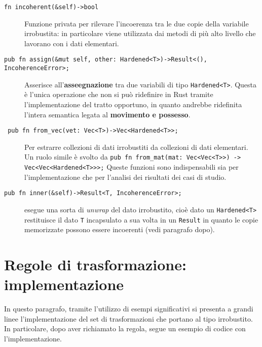 \begin{description}
    \item[\texttt{fn incoherent(\&self)->bool}] Funzione privata per rilevare l'incoerenza tra le due copie della variabile irrobustita: in particolare viene utilizzata dai metodi di più alto livello che lavorano con i dati elementari.
    \item[\texttt{pub fn assign(\&mut self, other: Hardened<T>)->Result<(), IncoherenceError>;}] Asserisce all'\textbf{asseegnazione} tra due variabili di tipo \texttt{Hardened<T>}. Questa è l'unica operazione che non si può ridefinire in Rust tramite l'implementazione del tratto opportuno, in quanto andrebbe ridefinita l'intera semantica legata al \textbf{movimento e possesso}.
    \item[\texttt{ pub fn from\_vec(vet: Vec<T>)->Vec<Hardened<T>>;} ] Per estrarre collezioni di dati irrobustiti da collezioni di dati elementari. Un ruolo simile è svolto da \texttt{pub fn from\_mat(mat: Vec<Vec<T>>) -> Vec<Vec<Hardened<T>>>;} Queste funzioni sono indispensabili sia per l'implementazione che per l'analisi dei risultati dei casi di studio.
    \item[\texttt{pub fn inner(\&self)->Result<T, IncoherenceError>;}] esegue una sorta di \textit{unwrap} del dato irrobustito, cioè dato un \texttt{Hardened<T>} restituisce il dato \texttt{T} incapsulato a sua volta in un \texttt{Result} in quanto le copie memorizzate possono essere incoerenti (vedi paragrafo dopo).
\end{description}

\section{Regole di trasformazione: implementazione}
In questo paragrafo, tramite l'utilizzo di esempi significativi si presenta a grandi linee l'implementazione del set di trasformazioni che portano al tipo irrobustito. In particolare, dopo aver richiamato la regola, segue un esempio di codice con l'implementazione.\\

\noindent
\begin{center}
%
\end{center}

